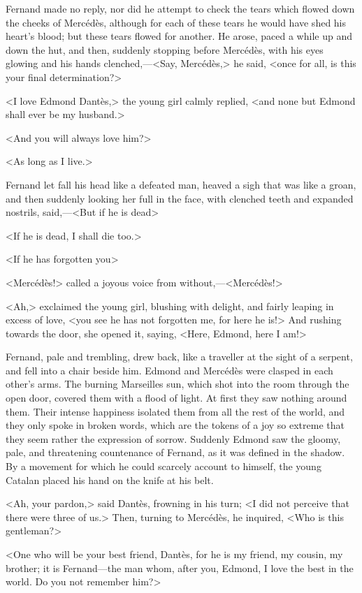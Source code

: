  Fernand made no reply, nor did he attempt to check the tears which flowed down the cheeks of Mercédès, although for each of these tears he would have shed his heart's blood; but these tears flowed for another. He arose, paced a while up and down the hut, and then, suddenly stopping before Mercédès, with his eyes glowing and his hands clenched,—<Say, Mercédès,> he said, <once for all, is this your final determination?> 

 <I love Edmond Dantès,> the young girl calmly replied, <and none but Edmond shall ever be my husband.> 

 <And you will always love him?> 

 <As long as I live.> 

 Fernand let fall his head like a defeated man, heaved a sigh that was like a groan, and then suddenly looking her full in the face, with clenched teeth and expanded nostrils, said,—<But if he is dead\longdash> 

 <If he is dead, I shall die too.> 

 <If he has forgotten you\longdash> 

 <Mercédès!> called a joyous voice from without,—<Mercédès!> 

 <Ah,> exclaimed the young girl, blushing with delight, and fairly leaping in excess of love, <you see he has not forgotten me, for here he is!> And rushing towards the door, she opened it, saying, <Here, Edmond, here I am!> 

 Fernand, pale and trembling, drew back, like a traveller at the sight of a serpent, and fell into a chair beside him. Edmond and Mercédès were clasped in each other's arms. The burning Marseilles sun, which shot into the room through the open door, covered them with a flood of light. At first they saw nothing around them. Their intense happiness isolated them from all the rest of the world, and they only spoke in broken words, which are the tokens of a joy so extreme that they seem rather the expression of sorrow. Suddenly Edmond saw the gloomy, pale, and threatening countenance of Fernand, as it was defined in the shadow. By a movement for which he could scarcely account to himself, the young Catalan placed his hand on the knife at his belt. 

 <Ah, your pardon,> said Dantès, frowning in his turn; <I did not perceive that there were three of us.> Then, turning to Mercédès, he inquired, <Who is this gentleman?> 

 <One who will be your best friend, Dantès, for he is my friend, my cousin, my brother; it is Fernand—the man whom, after you, Edmond, I love the best in the world. Do you not remember him?> 

